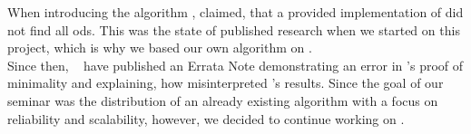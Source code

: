 
When introducing the algorithm \ocddiscover{}, \citeauthor{consonni} claimed, that a provided implementation of \fastod{} did not find all \glspl{od}.
%
This was the state of published research when we started on this project, which is why we based our own algorithm on \ocddiscover{}. \\
Since then, \citeauthor{szlichta:errata}~\cite{szlichta:errata} have published an Errata Note demonstrating an error in \citeauthor{consonni}'s proof of minimality and explaining, how \citeauthor{consonni} misinterpreted \fastod{}'s results.
Since the goal of our seminar was the distribution of an already existing algorithm with a focus on reliability and scalability, however, we decided to continue working on \ocddiscover{}.
